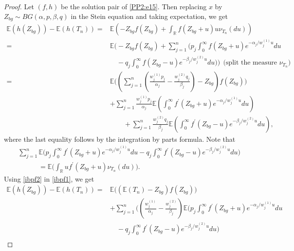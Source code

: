\documentclass[12pt, a4paper,reqno]{amsart}
\theoremstyle{definition}
\theoremstyle{myremark}
\numberwithin{equation}{section}
\begin{document}
\begin{proof}  
Let $(f,h)$ be the solution pair of \eqref{PP2:e15}. Then replacing $x$ by $Z_{bg} \sim BG(\alpha,p,\beta,q)$ in the Stein equation and taking expectation, we get
	\begin{align}
	\nonumber	\mathbb{E}(h(Z_{bg}))-\mathbb{E}(h(T_n))=&\mathbb{E}\left(-Z_{bg}f(Z_{bg})+\displaystyle\int_{\mathbb{R}}f(Z_{bg}+u)u\nu_{T_n}(du)  \right)\\
	\nonumber=&\mathbb{E} \bigg(-Z_{bg}f(Z_{bg})+\sum_{j=1}^{n}\bigg(p_j \displaystyle\int_{0}^{\infty}f(Z_{bg}+u)e^{-\alpha_j/w_{j}^{(1)} u}du\\
	\nonumber	
	&\quad -  q_j \displaystyle\int_{0}^{\infty}f(Z_{bg}-u)e^{-\beta_j/w_{j}^{(2)} u}du \bigg)\bigg)~~\text{(split the  measure $\nu_{T_n}$)}\\
	\nonumber=& \mathbb{E}\bigg( \left(  \sum_{j=1}^{n}\left(\frac{w_{j}^{(1)}p_j}{\alpha_j}-\frac{w_{j}^{(2)}q_j}{\beta_j}   \right) -Z_{bg} \right)f(Z_{bg})\bigg)\\
\nonumber	&+\sum_{j=1}^{n}\frac{w_{j}^{(1)}p_j}{\alpha_j}\mathbb{E} \left(\displaystyle\int_{0}^{\infty}f^{\prime}(Z_{bg}+u)e^{-\alpha_j/w_{j}^{(1)} u} du \right)\\
	\label{ibpf1}&\quad\quad+\sum_{j=1}^{n}\frac{w_{j}^{(2)}q_j}{\beta_j}\mathbb{E} \left(\displaystyle\int_{0}^{\infty}f^{\prime}(Z_{bg}-u)e^{-\beta_j/w_{j}^{(2)} u} du \right), 
	\end{align}
	\noindent
	where the last equality follows by the integration by parts formula. Note that
	\begin{align}\label{ibpf2}
	\nonumber&\sum_{j=1}^{n}\mathbb{E}\bigg(p_j \int_{0}^{\infty}f^{\prime}(Z_{bg}+u)e^{-\alpha_j/w_{j}^{(1)} u}du-	q_j\int_{0}^{\infty}f^{\prime}(Z_{bg}-u)e^{-\beta_j/w_{j}^{(2)} u}du\bigg)\\
	&\quad\quad\quad=\mathbb{E}\bigg(\displaystyle\int_{\mathbb R}uf^{\prime}(Z_{bg}+u)\nu_{T_n}(du)\bigg).
	\end{align}
	Using \eqref{ibpf2} in \eqref{ibpf1}, we get
	\begin{align}
	\nonumber\mathbb{E}(h(Z_{bg}))-\mathbb{E}(h(T_n))=&\mathbb{E} \bigg(\left(  \mathbb{E}(T_n) -Z_{bg} \right)f(Z_{bg})\bigg)\\
\nonumber	&+\sum_{j=1}^{n}\bigg(\left(\frac{w_{j}^{(1)} }{\alpha_j}-\frac{w_{j}^{(2)}}{\beta_j} \right)\mathbb{E} \bigg( p_j \int_{0}^{\infty}f^{\prime}(Z_{bg}+u)e^{-\alpha_j/w_{j}^{(1)} u}du\\
	\nonumber&\quad-	q_j\int_{0}^{\infty}f^{\prime}(Z_{bg}-u)e^{-\beta_j/w_{j}^{(2)} u}du \bigg)\\

\end{align}
\end{proof}
\end{document}
